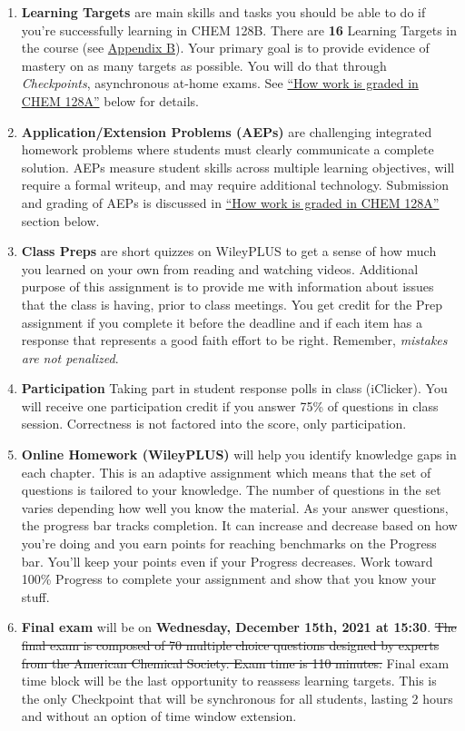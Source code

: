 \begin{enumerate}
\def\labelenumi{\arabic{enumi}.}
\tightlist
\item
  \textbf{Learning Targets} are main skills and tasks you should be able
  to do if you're successfully learning in CHEM 128B. There are
  \textbf{16} Learning Targets in the course (see
  \protect\hyperlink{LT}{Appendix B}). Your primary goal is to provide
  evidence of mastery on as many targets as possible. You will do that
  through \emph{Checkpoints}, asynchronous at-home exams. See
  \protect\hyperlink{grading}{``How work is graded in CHEM 128A''} below
  for details.
\item
  \textbf{Application/Extension Problems (AEPs)} are challenging
  integrated homework problems where students must clearly communicate a
  complete solution. AEPs measure student skills across multiple
  learning objectives, will require a formal writeup, and may require
  additional technology. Submission and grading of AEPs is discussed in
  \protect\hyperlink{grading}{``How work is graded in CHEM 128A''}
  section below.
\item
  \textbf{Class Preps} are short quizzes on WileyPLUS to get a sense of
  how much you learned on your own from reading and watching videos.
  Additional purpose of this assignment is to provide me with
  information about issues that the class is having, prior to class
  meetings. You get credit for the Prep assignment if you complete it
  before the deadline and if each item has a response that represents a
  good faith effort to be right. Remember, \emph{mistakes are not
  penalized}.
\item
  \textbf{Participation} Taking part in student response polls in class
  (iClicker). You will receive one participation credit if you answer
  75\% of questions in class session. Correctness is not factored into
  the score, only participation.
\item
  \textbf{Online Homework (WileyPLUS)} will help you identify knowledge
  gaps in each chapter. This is an adaptive assignment which means that
  the set of questions is tailored to your knowledge. The number of
  questions in the set varies depending how well you know the material.
  As your answer questions, the progress bar tracks completion. It can
  increase and decrease based on how you're doing and you earn points
  for reaching benchmarks on the Progress bar. You'll keep your points
  even if your Progress decreases. Work toward 100\% Progress to
  complete your assignment and show that you know your stuff.
\item
  \textbf{Final exam} will be on \textbf{Wednesday, December 15th, 2021
  at 15:30}. \sout{The final exam is composed of 70 multiple choice
  questions designed by experts from the American Chemical Society. Exam
  time is 110 minutes.} Final exam time block will be the last
  opportunity to reassess learning targets. This is the only Checkpoint
  that will be synchronous for all students, lasting 2 hours and without
  an option of time window extension.
\end{enumerate}

